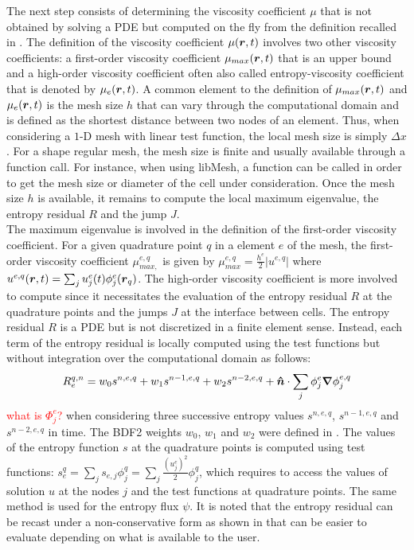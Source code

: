 The next step consists of determining the viscosity coefficient $\mu$ that is not obtained by solving a PDE but computed on the fly from the definition recalled in . The definition of the viscosity coefficient $\mu(\boldsymbol r,t)$ involves two other viscosity coefficients: a first-order viscosity coefficient $\mu_{max}(\boldsymbol r,t)$ that is an upper bound and a high-order viscosity coefficient often also called entropy-viscosity coefficient that is denoted by $\mu_e(\boldsymbol r,t)$. A common element to the definition of $\mu_{max}(\boldsymbol r,t)$ and $\mu_e(\boldsymbol r,t)$ is the mesh size $h$ that can vary through the computational domain and is defined as the shortest distance between two nodes of an element. Thus, when considering a $1$-D mesh with linear test function, the local mesh size is simply $\Delta x$. For a shape regular mesh, the mesh size is finite and usually available through a function call. For instance, when using libMesh, a function can be called in order to get the mesh size or diameter of the cell under consideration. Once the mesh size $h$ is available, it remains to compute the local maximum eigenvalue, the entropy residual $R$ and the jump $J$. \\
The maximum eigenvalue is involved in the definition of the first-order viscosity coefficient. For a given quadrature point $q$ in a element $e$ of the mesh, the first-order viscosity coefficient $\mu_{max,}^{e,q}$ is given by  $\mu_{max}^{e,q} = \frac{h^e}{2} | u^{e,q} |$ where $u^{e,q}(\boldsymbol r,t) = \sum_j u_{j}^e(t) \phi^e_j(\boldsymbol r_q)$. The high-order viscosity coefficient is more involved to compute since it necessitates the evaluation of the entropy residual $R$ at the quadrature points and the jumps $J$ at the interface between cells. The entropy residual $R$ is a PDE but is not discretized in a finite element sense. Instead, each term of the entropy residual is locally computed using the test functions but without integration over the computational domain as follows:
%
\begin{equation}\label{eq:res_disc_sct2}
R_{e}^{q,n} = w_0 s^{n,e,q} + w_1 s^{n-1,e,q} + w_2 s^{n-2,e,q} +  \boldsymbol{\hat{n}} \cdot  \sum_j \phi_{j}^e\boldsymbol{\nabla} \phi^{e,q}_j
\end{equation}
\textcolor{red}{what is $\Phi_{j}^e$?}
when considering three successive entropy values $s^{n,e,q}$, $s^{n-1,e,q}$ and $s^{n-2,e,q}$ in time. The BDF2 weights $w_0$, $w_1$ and $w_2$ were defined in . The values of the entropy function $s$ at the quadrature points is computed using test functions: $s^q_e = \sum_j s_{e,j} \phi^q_j = \sum_j \frac{(u_{j}^e)^2}{2} \phi^q_j$, which requires to access the values of solution $u$ at the nodes $j$ and the test functions at quadrature points. The same method is used for the entropy flux $\psi$. It is noted that the entropy residual can be recast under a non-conservative form as shown in  that can be easier to evaluate depending on what is available to the user.
